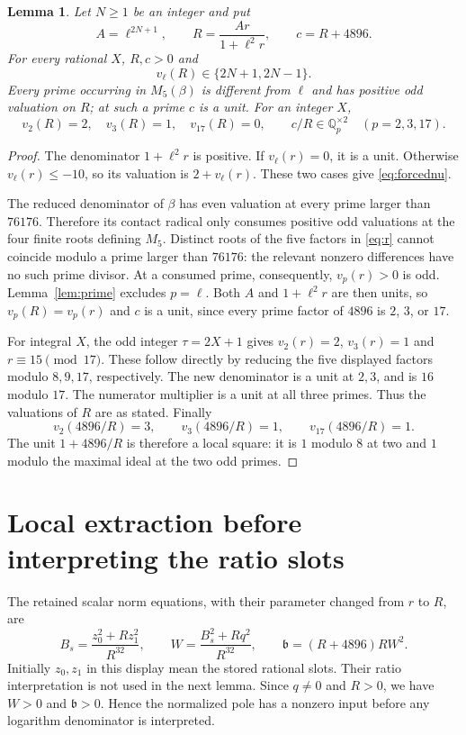 \documentclass[11pt,a4paper]{article}
\newtheorem{lemma}[theorem]{Lemma}
\theoremstyle{definition}\newtheorem{definition}[theorem]{Definition}
\theoremstyle{remark}\newtheorem{remark}[theorem]{Remark}
\newcommand{\Q}{\mathbb Q}\newcommand{\Z}{\mathbb Z}
\begin{document}
\begin{lemma}\label{lem:normalizer}
Let $N\ge1$ be an integer and put
\[
 A=\ell^{2N+1},\qquad
 R=\frac{A r}{1+\ell^2 r},\qquad c=R+4896.
\]
For every rational $X$, $R,c>0$ and
\begin{equation}\label{eq:forcednu}
 v_\ell(R)\in\{2N+1,2N-1\}.
\end{equation}
Every prime occurring in $M_5(\beta)$ is different from $\ell$ and
has positive odd valuation on $R$; at such a prime $c$ is a unit.
For an integer $X$,
\begin{equation}\label{eq:smalllocal}
 v_2(R)=2,\quad v_3(R)=1,\quad v_{17}(R)=0,
 \qquad c/R\in\Q_p^{\times2}\quad(p=2,3,17).
\end{equation}
\end{lemma}
\begin{proof}
The denominator $1+\ell^2r$ is positive. If $v_\ell(r)=0$, it is a
unit. Otherwise $v_\ell(r)\le-10$, so its valuation is
$2+v_\ell(r)$. These two cases give \eqref{eq:forcednu}.

The reduced denominator of $\beta$ has even valuation at every prime
larger than $76176$. Therefore its contact radical only consumes positive
odd valuations at the four finite roots defining $M_5$. Distinct roots
of the five factors in \eqref{eq:r} cannot coincide modulo a prime
larger than $76176$: the relevant nonzero differences have no such
prime divisor. At a consumed prime, consequently, $v_p(r)>0$ is odd.
Lemma~\ref{lem:prime} excludes $p=\ell$. Both $A$ and
$1+\ell^2r$ are then units, so $v_p(R)=v_p(r)$ and $c$ is a unit,
since every prime factor of $4896$ is $2$, $3$, or $17$.

For integral $X$, the odd integer $\tau=2X+1$ gives
$v_2(r)=2$, $v_3(r)=1$ and $r\equiv15\pmod{17}$. These follow directly
by reducing the five displayed factors modulo $8,9,17$, respectively.
The new denominator is a unit at $2,3$, and is $16$ modulo $17$.
The numerator multiplier is a unit at all three primes. Thus the
valuations of $R$ are as stated. Finally
\[
 v_2(4896/R)=3,\qquad v_3(4896/R)=1,\qquad
 v_{17}(4896/R)=1.
\]
The unit $1+4896/R$ is therefore a local square: it is $1$ modulo $8$
at two and $1$ modulo the maximal ideal at the two odd primes.
\end{proof}

\section{Local extraction before interpreting the ratio slots}
The retained scalar norm equations, with their parameter changed from
$r$ to $R$, are
\begin{equation}\label{eq:normtree}
 B_s=\frac{z_0^2+Rz_1^2}{R^{32}},\qquad
 W=\frac{B_s^2+Rq^2}{R^{32}},\qquad
 \mathfrak b=(R+4896)RW^2.
\end{equation}
Initially $z_0,z_1$ in this display mean the stored rational slots. Their
ratio interpretation is not used in the next lemma. Since $q\ne0$ and
$R>0$, we have $W>0$ and $\mathfrak b>0$. Hence the normalized pole
has a nonzero input before any logarithm denominator is interpreted.
\end{document}
